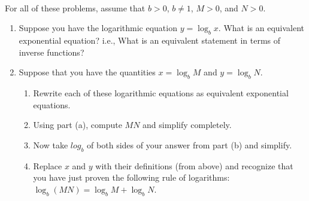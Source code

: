 \\
For all of these problems, assume that $b>0$, $b \neq 1$, $M>0$, and $N>0$.

\begin{enumerate}

\item Suppose you have the logarithmic equation $y=\log_b{x}$.  What is an equivalent exponential equation?  i.e., What is an equivalent statement in terms of inverse functions?

\item Suppose that you have the quantities $x=\log_b{M}$ and $y=\log_b{N}$.

\begin{enumerate}

\item Rewrite each of these logarithmic equations as equivalent exponential equations.

 \fi

\item Using part (a), compute $MN$ and simplify completely.

 \fi

\item Now take $log_b$ of both sides of your answer from part (b) and simplify.

 \fi

\item Replace $x$ and $y$ with their definitions (from above) and recognize that you have just proven the following rule of logarithms: $\log_b{(MN)}=\log_b{M}+\log_b{N}$.

\end{enumerate}




\end{enumerate}
